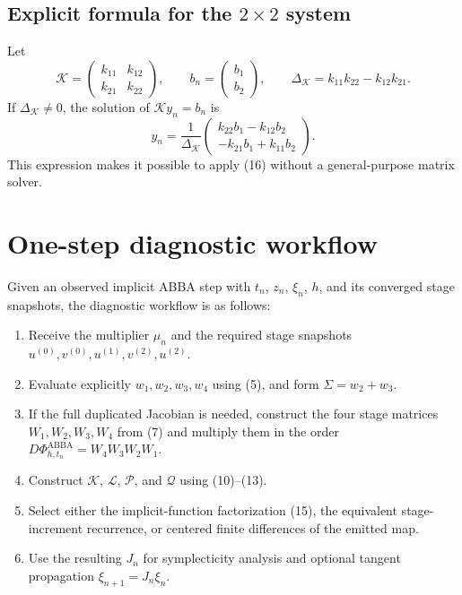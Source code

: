 \documentclass[11pt,a4paper]{article}
\newcommand{\PhiAB}{\Phi^{\mathrm{ABBA}}_{h,t_n}}
\begin{document}
\subsection{Explicit formula for the \texorpdfstring{$2\times2$}{2 x 2} system}

Let
\[
 \mathcal K=
 \begin{pmatrix}
  k_{11}&k_{12}\\k_{21}&k_{22}
 \end{pmatrix},
 \qquad
 b_n=
 \begin{pmatrix}b_1\\b_2\end{pmatrix},
 \qquad
 \Delta_{\mathcal K}=k_{11}k_{22}-k_{12}k_{21}.
\]
If $\Delta_{\mathcal K}\neq0$, the solution of $\mathcal K y_n=b_n$ is
\[
 \boxed{
 y_n=
 \frac{1}{\Delta_{\mathcal K}}
 \begin{pmatrix}
  k_{22}b_1-k_{12}b_2\\
  -k_{21}b_1+k_{11}b_2
 \end{pmatrix}.
 }
 \tag{17}
\]
This expression makes it possible to apply (16) without a general-purpose matrix solver.

\section{One-step diagnostic workflow}

Given an observed implicit ABBA step with $t_n$, $z_n$, $\xi_n$, $h$, and its converged
stage snapshots, the diagnostic workflow is as follows:

\begin{enumerate}
	\item Receive the multiplier $\mu_n$ and the required stage snapshots
       $u^{(0)},v^{(0)},u^{(1)},v^{(2)},u^{(2)}$.

	\item Evaluate explicitly $w_1,w_2,w_3,w_4$ using (5), and form
       $\Sigma=w_2+w_3$.

	\item If the full duplicated Jacobian is needed, construct the four stage matrices
       $W_1,W_2,W_3,W_4$ from (7) and multiply them in the order
       $D\PhiAB=W_4W_3W_2W_1$.

	\item Construct $\mathcal K$, $\mathcal L$, $\mathcal P$, and $\mathcal Q$ using
       (10)--(13).

	\item Select either the implicit-function factorization (15), the equivalent
       stage-increment recurrence, or centered finite differences of the emitted map.

	\item Use the resulting $J_n$ for symplecticity analysis and optional tangent
       propagation $\xi_{n+1}=J_n\xi_n$.
\end{enumerate}
\end{document}
